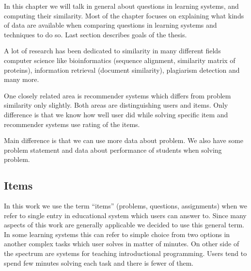 \documentclass[
  digital, %
  table,   %
  nolof,     %
  nolot,     %
  nocover
]{fithesis3}
\begin{document}



In this chapter we will talk in general about questions in learning
systems, and computing their similarity. Most of the chapter focuses on
explaining what kinds of data are available when comparing questions in
learning systems and techniques to do so. Last section describes goals
of the thesis.


A lot of research has been dedicated to similarity in many different
fields computer science like bioinformatics (sequence alignment,
similarity matrix of proteins), information retrieval (document
similarity), plagiarism detection and many more.


One closely related area is recommender systems which differs from
problem similarity only slightly. Both areas are distinguishing users
and items. Only difference is that we know how well user did while
solving specific item and recommender systems use rating of the items.


Main difference is that we can use more data about problem. We also have
some problem statement and data about performance of students when
solving problem.

\subsection{Items}\label{items}



In this work we use the term ``items'' (problems, questions,
assignments) when we refer to single entry in educational system which
users can answer to. Since many aspects of this work are generally
applicable we decided to use this general term. In some learning systems
this can refer to simple choice from two options in another complex
tasks which user solves in matter of minutes. On other side of the
spectrum are systems for teaching introductional programming. Users tend
to spend few minutes solving each task and there is fewer of them.

\end{document}
